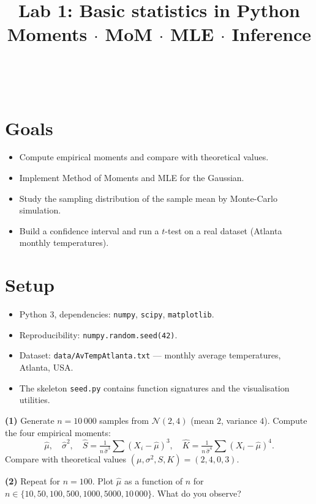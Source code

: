 \documentclass[a4paper,11pt]{article}
\title{Lab 1: Basic statistics in Python\\
\large Moments $\cdot$ MoM $\cdot$ MLE $\cdot$ Inference}
\author{\auteurNom\\\auteurEmail\\\auteurInstitution}
\date{\anneeUniversitaire}
\begin{document}
\maketitle

\section*{Goals}
\begin{itemize}
  \item Compute empirical moments and compare with theoretical values.
  \item Implement Method of Moments and MLE for the Gaussian.
  \item Study the sampling distribution of the sample mean by
        Monte-Carlo simulation.
  \item Build a confidence interval and run a $t$-test on a real
        dataset (Atlanta monthly temperatures).
\end{itemize}

\section*{Setup}
\begin{itemize}
  \item Python 3, dependencies: \texttt{numpy}, \texttt{scipy},
        \texttt{matplotlib}.
  \item Reproducibility: \texttt{numpy.random.seed(42)}.
  \item Dataset: \texttt{data/AvTempAtlanta.txt} — monthly
        average temperatures, Atlanta, USA.
  \item The skeleton \texttt{seed.py} contains function signatures
        and the visualisation utilities.
\end{itemize}

\begin{exercise}
\textbf{(1)} Generate $n = 10\,000$ samples from $\mathcal{N}(2, 4)$
(mean $2$, variance $4$). Compute the four empirical moments:
\[
  \widehat{\mu}, \quad \widehat{\sigma}^2,
  \quad \widehat{S} = \tfrac{1}{n\,\widehat\sigma^3}\sum (X_i - \widehat\mu)^3,
  \quad \widehat{K} = \tfrac{1}{n\,\widehat\sigma^4}\sum (X_i - \widehat\mu)^4.
\]
Compare with theoretical values $(\mu, \sigma^2, S, K) = (2, 4, 0, 3)$.

\textbf{(2)} Repeat for $n = 100$. Plot $\widehat{\mu}$ as a function of
$n$ for $n \in \{10, 50, 100, 500, 1000, 5000, 10\,000\}$.
What do you observe?
\end{exercise}
\end{document}
